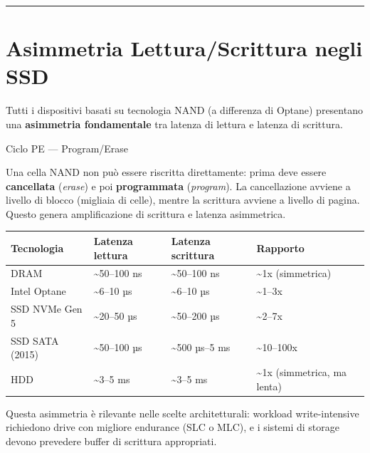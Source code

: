 \documentclass[
  italian,
  openany]{book}
\newcounter{none} %
\begin{document}
\begin{center}\rule{0.5\linewidth}{0.5pt}\end{center}

\section{Asimmetria Lettura/Scrittura negli
SSD}\label{asimmetria-letturascrittura-negli-ssd}

Tutti i dispositivi basati su tecnologia NAND (a differenza di Optane)
presentano una \textbf{asimmetria fondamentale} tra latenza di lettura e
latenza di scrittura.

\begin{calloutdefinition}{Ciclo PE — Program/Erase}

Una cella NAND non può essere riscritta direttamente: prima deve essere
\textbf{cancellata} (\emph{erase}) e poi \textbf{programmata}
(\emph{program}). La cancellazione avviene a livello di blocco (migliaia
di celle), mentre la scrittura avviene a livello di pagina. Questo
genera amplificazione di scrittura e latenza asimmetrica.

\end{calloutdefinition}

{\def\LTcaptype{none} %
\begin{longtable}[]{@{}llll@{}}
\toprule\noalign{}
Tecnologia & Latenza lettura & Latenza scrittura & Rapporto \\
\midrule\noalign{}
\endhead
\bottomrule\noalign{}
\endlastfoot
DRAM & \textasciitilde50--100 ns & \textasciitilde50--100 ns &
\textasciitilde1x (simmetrica) \\
Intel Optane & \textasciitilde6--10 µs & \textasciitilde6--10 µs &
\textasciitilde1--3x \\
SSD NVMe Gen 5 & \textasciitilde20--50 µs & \textasciitilde50--200 µs &
\textasciitilde2--7x \\
SSD SATA (2015) & \textasciitilde50--100 µs & \textasciitilde500 µs--5
ms & \textasciitilde10--100x \\
HDD & \textasciitilde3--5 ms & \textasciitilde3--5 ms &
\textasciitilde1x (simmetrica, ma lenta) \\
\end{longtable}
}

Questa asimmetria è rilevante nelle scelte architetturali: workload
write-intensive richiedono drive con migliore endurance (SLC o MLC), e i
sistemi di storage devono prevedere buffer di scrittura appropriati.
\end{document}
